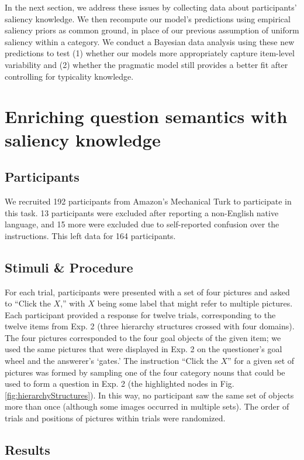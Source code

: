 \documentclass[12pt, floatsintext, jou]{apa6}
\begin{document}
In the next section, we address these issues by collecting data about participants' saliency knowledge. We then recompute our model's predictions using empirical saliency priors as common ground, in  place of our previous assumption of uniform saliency within a category. We conduct a Bayesian data analysis using these new predictions to test (1) whether our models more appropriately capture item-level variability and (2) whether the pragmatic model still provides a better fit after controlling for typicality knowledge.

\section{Enriching question semantics with saliency knowledge}

\subsection{Participants} 
We recruited 192 participants from Amazon's Mechanical Turk to participate in this task. 13 participants were excluded after reporting a non-English native language, and 15 more were excluded due to self-reported confusion over the instructions. This left data for 164 participants.

\subsection{Stimuli \& Procedure}
For each trial, participants were presented with a set of four pictures and asked to ``Click the $X$,'' with $X$ being some label that might refer to multiple pictures. Each participant provided a response for twelve trials, corresponding to the twelve items from Exp. 2 (three hierarchy structures crossed with four domains). The four pictures corresponded to the four goal objects of the given item; we used the same pictures that were displayed in Exp. 2 on the questioner's goal wheel and the answerer's `gates.' The instruction ``Click the $X$'' for a given set of pictures was formed by sampling one of the four category nouns that could be used to form a question in Exp. 2 (the highlighted nodes in Fig. \ref{fig:hierarchyStructures}). In this way, no participant saw the same set of objects more than once (although some images occurred in multiple sets). The order of trials and positions of pictures within trials were randomized.

\subsection{Results}
\end{document}
